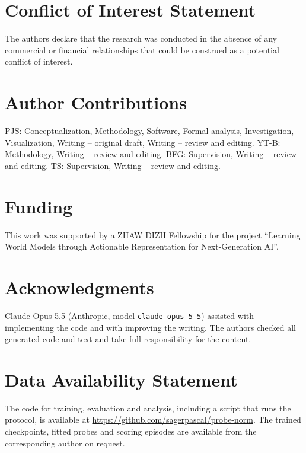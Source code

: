 \section*{Conflict of Interest Statement}
The authors declare that the research was conducted in the absence of any commercial or financial relationships that could be construed as a potential conflict of interest.

\section*{Author Contributions}
PJS: Conceptualization, Methodology, Software, Formal analysis, Investigation, Visualization, Writing -- original draft, Writing -- review and editing. YT-B: Methodology, Writing -- review and editing. BFG: Supervision, Writing -- review and editing. TS: Supervision, Writing -- review and editing.

\section*{Funding}
This work was supported by a ZHAW DIZH Fellowship for the project ``Learning World Models through Actionable Representation for Next-Generation AI''.

\section*{Acknowledgments}
Claude Opus 5.5 (Anthropic, model \texttt{claude-opus-5-5}) assisted with implementing the code and with improving the writing. The authors checked all generated code and text and take full responsibility for the content.

\section*{Data Availability Statement}
The code for training, evaluation and analysis, including a script that runs the protocol, is available at \url{https://github.com/sagerpascal/probe-norm}. The trained checkpoints, fitted probes and scoring episodes are available from the corresponding author on request.
